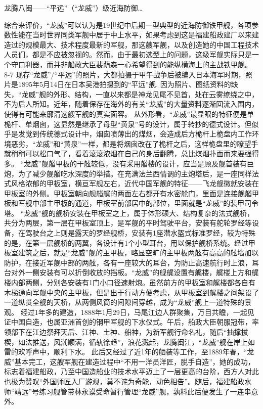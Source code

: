 \documentclass[12pt,UTF8]{ctexbook}
\begin{document}
龙腾八闽——“平远”（“龙威”）级近海防御…

综合来评价，“龙威”可以认为是19世纪中后期一型典型的近海防御铁甲舰，各项参数性能在当时世界同类军舰中居于中上水平，如果考虑到这是福建船政建厂以来建造过的规模最大、技术程度最新的军舰，那这艘军舰，以及创造她的中国工程技术人员们，都是不应被忽视的。然而，由于最初选型上的问题，这级军舰实际只是一个守口利器，而并非船政大臣裴荫森一心希望得到的能纵横海上的主战铁甲舰。
8-7
现存“龙威”/“平远”的照片，大都拍摄于甲午战争后被编入日本海军时期，照片是1895年5月14日在日本吴港拍摄到的“平远”舰.
因为照片、图纸资料的缺失，“龙威”舰的外形、结构，一直以来都是神龙见尾不见首，处在云雾缭绕之中，不为后人所知。近年，随着保存在海外的有关“龙威”的大量资料逐渐回流入国内，使得有可能来廓清这艘军舰的真实面容。
从外形看，“龙威”最显眼的特征便是单桅杆、单烟囱，这显然是继承了母型“黄泉”号的设计，属于转抄的德式设计。但似乎是发觉到传统德式设计中，烟囱喷薄出的煤烟，会造成后方桅杆上桅盘内工作环境恶劣，“龙威”和“黄泉”一样，都是将烟囱改在了桅杆之后，这样桅盘里的瞭望手就稍稍可以松口气了，看着滚滚浓烟在自己的身后翻腾，总比煤烟扑面而来要强得多。
“龙威”舰艏甲板的干舷较低，没有采用艏楼的设计，应当是顾及舰首装有巨炮，为了减少舰艏吃水深度的举措。在充满法兰西情调的主炮塔后，是一座同样法式风格浓郁的甲板室，横亘军舰左右，近代中国军舰的特征——飞龙舰徽就安装在甲板室的外侧。甲板室朝向舰艏艉的两面左右都开有水密舱门，里面是连接舰艏甲板和军舰中部主甲板的通道，甲板室前部居中的部位，里面就是“龙威”的装甲司令塔。 “龙威”舰的舰桥安装在甲板室之上，属于体形硕大、结构复杂的法式舰桥，共分为两层，第一层在甲板室顶上，是军舰的平时驾驶平台，安装有舵轮罗经等设备，在驾驶台之上则是露天的罗经舰桥，安装有1座潜水盔式标准罗经，较为特殊的是，在第一层舰桥的两翼，各设计有1个小型耳台，用以保护舰桥系统。经过甲板室建筑之后，就是“龙威”舰的主甲板，略显空旷的主甲板两舷有高高的舷墙加以防护，在接近军舰中部的两舷，各有一座较大的耳台，为防止高速航行时上浪，耳台对外一侧安装有可以折倒收放的挡板。“龙威”的舰艉设置有艉楼，艉楼上方和艉楼内部两侧，分别各安装有1门小口径速射炮。虽然前方的甲板室和艉楼都各自有木梯通向军舰中央的主甲板，但是出于行动方便考虑，从甲板室到艉楼之间架设了一道纵贯全舰的天桥，从两侧风筒的间隙间穿越，成为“龙威”舰上一道特殊的景观。
经过1年多的建造，1888年1月29日，马尾江边人群聚集，万目共瞻，一起见证中国自造，也属亚洲首创的钢甲军舰的下水仪式。午后，船政大臣朝服冠带，率领部下在江边祭拜天后、江神、土神、船神，为新军舰行命名礼，随后“抽撑拔楔，如法推送，风潮顺满，循轨徐趋”，浪花溅起，龙腾闽江，“龙威”舰在岸上如雷的欢呼声中，顺利下水。 此后又经过了近1年的舾装等工作，至1889年春，“龙威”基本完工，这艘军舰在建造过程中“不用一洋员洋匠，脱手自造”，她的成功，标志着福建船政，乃至中国造船业的技术水平迈上了一层更高的台阶，西方人对此也极为赞叹“外国师匠入厂游观，莫不诧为奇能，动色相告”。随后，福建船政水师“靖远”号练习舰管带林永谟受命暂行管理“龙威”舰，孰料此后便发生了一连串意外。
\end{document}
